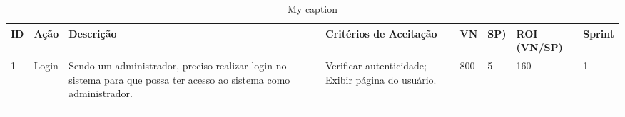 \begin{table}[hbt]
\centering
\caption{My caption}
\label{my-label}
\begin{tabular}{p{0.4cm}|p{1cm}|p{5cm}|p{1cm}|p{2cm}|p{2cm}p{2cm}|p{2cm}}
\hline
\textbf{ID} & \textbf{Ação} & \textbf{Descrição}                                                                                                 & \textbf{Critérios de Aceitação} & \textbf{VN} & \textbf{SP)} & \textbf{ROI (VN/SP)} & \textbf{Sprint} \\ \hline
1                               & Login                             & Sendo um administrador, preciso realizar login no sistema para que possa ter acesso ao sistema como administrador. & Verificar autenticidade; Exibir página do usuário.  & 800                                                & 5                                                           & 160                                      & 1                                   \\ \hline

                                &                                   &                                                                                                                    &                                                     &                                                    &                                                             &                                          &                                     \\ \hline
                                &                                   &                                                                                                                    &                                                     &                                                    &                                                             &                                          &                                     \\ \hline
\end{tabular}
\end{table}


